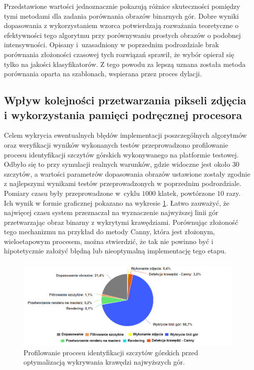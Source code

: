 Przedstawione wartości jednoznacznie pokazują różnice skuteczności pomiędzy tymi metodami dla zadania porównania obrazów binarnych gór. Dobre wyniki dopasowania z wykorzystaniem wzorca potwierdzają rozważania teoretyczne o efektywności tego algorytmu przy porównywaniu prostych obrazów o podobnej intensywności. Opisany i~uzasadniony w poprzednim podrozdziale brak porównania złożoności czasowej tych rozwiązań sprawił, że wybór opierał się tylko na jakości klasyfikatorów. Z tego powodu za lepszą uznana została metoda porównania oparta na szablonach, wspierana przez proces dylacji. 

\subsection{Wpływ kolejności przetwarzania pikseli zdjęcia i wykorzystania pamięci podręcznej procesora} \label{sec:profilowanie}

Celem wykrycia ewentualnych błędów implementacji poszczególnych algorytmów oraz weryfikacji wyników wykonanych testów przeprowadzono profilowanie procesu identyfikacji szczytów górskich wykonywanego na platformie testowej. Odbyło się to przy symulacji realnych warunków, gdzie widoczne jest około $30$ szczytów, a wartości parametrów dopasowania obrazów ustawione zostały zgodnie z najlepszymi wynikami testów przeprowadzonych w poprzednim podrozdziale. Pomiary czasu były przeprowadzone w~cyklu $1000$ klatek, powtórzone $10$ razy. Ich wynik w formie graficznej pokazano na wykresie \ref{fig:profilowanie_przed_linia}. Łatwo zauważyć, że najwięcej czasu system przeznaczał na wyznaczenie najwyższej linii gór przetwarzając obraz binarny z wykrytymi krawędziami. Porównując złożoność tego mechanizmu na przykład do metody Canny, która jest złożonym, wieloetapowym procesem, można stwierdzić, że tak nie powinno być i hipotetycznie założyć błędną lub nieoptymalną implementację tego etapu.

\begin{figure}[!h]
    \centering \includegraphics[width=0.9\linewidth]{img/pie_chart_profilowanie_przed_linii.png}
    \caption{Profilowanie procesu identyfikacji szczytów górskich przed optymalizacją wykrywania krawędzi najwyższych gór.}
    \label{fig:profilowanie_przed_linia}
\end{figure}



